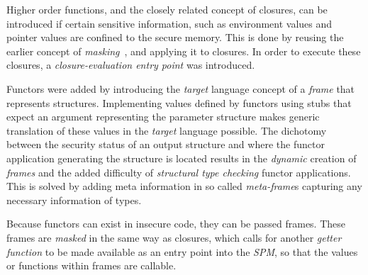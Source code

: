 Higher order functions, and the closely related concept of closures, can be introduced if certain sensitive information, such as environment values and pointer values are confined to the secure memory.
This is done by reusing the earlier concept of \emph{masking}~\cite{Patrignani}, and applying it to closures.
In order to execute these closures, a \emph{closure-evaluation entry point} was introduced.

Functors were added by introducing the \emph{target} language concept of a \emph{frame} that represents structures.
Implementing values defined by functors using stubs that expect an argument representing the parameter structure makes generic translation of these values in the \emph{target} language possible.
The dichotomy between the security status of an output structure and where the functor application generating the structure is located results in the \emph{dynamic} creation of \emph{frames} and the added difficulty of \emph{structural type checking} functor applications.
This is solved by adding meta information in so called \emph{meta-frame}s capturing any necessary information of types.

Because functors can exist in insecure code, they can be passed frames. These frames are \emph{masked} in the same way as closures, which calls for another \emph{getter function} to be made available as an entry point into the \emph{SPM}, so that the values or functions within frames are callable.
